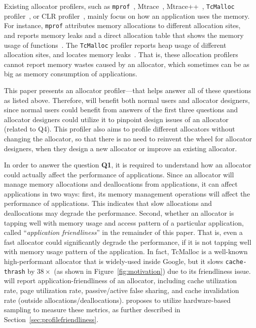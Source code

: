 Existing allocator profilers, such as \texttt{mprof}~\cite{Zorn:1988:MAP:894814}, Mtrace~\cite{mtrace}, Mtrace++~\cite{Lee:2000:DMM:786772.787150}, \texttt{TcMalloc} profiler~\cite{tcmalloc-profiler}, or CLR profiler~\cite{lupasc2014dynamic}, mainly focus on how an application uses the memory. For instance, \texttt{mprof} attributes memory allocations to different allocation sites, and reports memory leaks and a direct allocation table that shows the memory usage of functions~\cite{Zorn:1988:MAP:894814}. The \texttt{TcMalloc} profiler reports heap usage of different allocation sites, and locates memory leaks~\cite{tcmalloc-profiler}. That is, these allocation profilers cannot report memory wastes caused by an allocator, which sometimes can be as big as memory consumption of applications. 

This paper presents an allocator profiler--\MP{}--that helps answer all of these questions as listed above. Therefore, \MP{} will benefit both normal users and allocator designers, since normal users could benefit from answers of the first three questions and allocator designers could utilize it to pinpoint design issues of an allocator (related to Q4). This profiler also aims to profile different allocators without changing the allocator, so that there is no need to reinvent the wheel for allocator designers, when they design a new allocator or improve an existing allocator. 

In order to answer the question \textbf{Q1}, it is required to understand how an allocator could actually affect the performance of applications. Since an allocator will manage memory allocations and deallocations from applications, it can affect applications in two ways: first, its memory management operations will affect the performance of applications. This indicates that slow allocations and deallocations may degrade the performance.  Second, whether an allocator is tapping well with memory usage and access pattern of a particular application, called ``\textit{application friendliness}'' in the remainder of this paper. That is, even a fast allocator could significantly degrade the performance, if it is not tapping well with memory usage pattern of the application. In fact, TcMalloc is a well-known high-performant allocator that is widely-used inside Google, but it slows \texttt{cache-thrash} by $38\times$ (as shown in Figure~\ref{fig:motivation}) due to its friendliness issue. \MP{} will report application-friendliness of an allocator, including cache utilization rate, page utilization rate, passive/active false sharing, and cache invalidation rate (outside allocations/deallocations). \MP{} proposes to utilize hardware-based sampling to measure these metrics, as further described in Section~\ref{sec:profilefriendliness}. 

